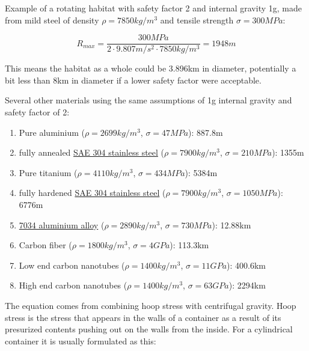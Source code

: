\documentclass[a4paper]{article}
\begin{document}
	\bigskip
	
	Example of a rotating habitat with safety factor 2 and internal gravity 1g, made from mild steel of density $\rho = 7850kg/m^3$ and tensile strength $\sigma = 300MPa$:
	
	$$ R_{max} = \frac{300MPa}{2 \cdot 9.807m/s^2 \cdot 7850kg/m^3} = 1948m $$
	
	This means the habitat as a whole could be 3.896km in diameter, potentially a bit less than 8km in diameter if a lower safety factor were acceptable.
	
	\bigskip
	
	Several other materials using the same assumptions of 1g internal gravity and safety factor of 2:
	
	\begin{enumerate}
		\item Pure aluminium ($\rho = 2699kg/m^3$, $\sigma = 47MPa$): 887.8m
		
		\item fully annealed \href{https://en.wikipedia.org/wiki/SAE_304_stainless_steel#Mechanical_properties}{SAE 304 stainless steel} ($\rho = 7900kg/m^3$, $\sigma = 210MPa$): 1355m
		
		\item Pure titanium ($\rho = 4110kg/m^3$, $\sigma = 434MPa$): 5384m
		
		\item fully hardened \href{https://en.wikipedia.org/wiki/SAE_304_stainless_steel#Mechanical_properties}{SAE 304 stainless steel} ($\rho = 7900kg/m^3$, $\sigma = 1050MPa$): 6776m
		
		\item \href{https://en.wikipedia.org/wiki/7034_aluminium_alloy}{7034 aluminium alloy} ($\rho = 2890kg/m^3$, $\sigma = 730MPa$): 12.88km
		
		\item Carbon fiber ($\rho = 1800kg/m^3$, $\sigma = 4GPa$): 113.3km
		
		\item Low end carbon nanotubes ($\rho = 1400kg/m^3$, $\sigma = 11GPa$): 400.6km
		
		\item High end carbon nanotubes ($\rho = 1400kg/m^3$, $\sigma = 63GPa$): 2294km
	\end{enumerate}
	
	\pagebreak
	
	The equation comes from combining hoop stress with centrifugal gravity. Hoop stress is the stress that appears in the walls of a container as a result of its presurized contents pushing out on the walls from the inside. For a cylindrical container it is usually formulated as this:
	
\end{document}
